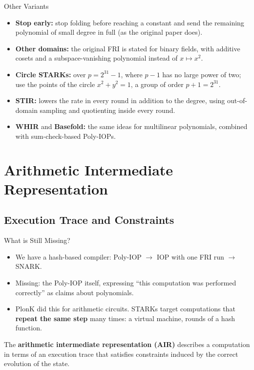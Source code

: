 \documentclass{zkdl-presentation-template}
\begin{document}
    \begin{frame}{Other Variants}
        \begin{itemize}
            \item \textbf{Stop early:} stop folding before reaching a constant and send the remaining polynomial of small degree in full (as the original paper does).\pause
            \item \textbf{Other domains:} the original FRI is stated for binary fields, with additive cosets and a subspace-vanishing polynomial instead of $x \mapsto x^2$.\pause
            \item \textbf{Circle STARKs:} over $p = 2^{31} - 1$, where $p - 1$ has no large power of two; use the points of the circle $x^2 + y^2 = 1$, a group of order $p + 1 = 2^{31}$.\pause
            \item \textbf{STIR:} lowers the rate in every round in addition to the degree, using out-of-domain sampling and quotienting inside every round.\pause
            \item \textbf{WHIR} and \textbf{Basefold:} the same ideas for multilinear polynomials, combined with sum-check-based Poly-IOPs.
        \end{itemize}
    \end{frame}

    \section{Arithmetic Intermediate Representation}

    \subsection{Execution Trace and Constraints}

    \begin{frame}{What is Still Missing?}
        \begin{itemize}
            \item We have a hash-based compiler: Poly-IOP $\to$ IOP with one FRI run $\to$ SNARK.\pause
            \item Missing: the Poly-IOP itself, expressing ``this computation was performed correctly'' as claims about polynomials.\pause
            \item PlonK did this for arithmetic circuits. STARKs target computations that \textbf{repeat the same step} many times: a virtual machine, rounds of a hash function.
        \end{itemize}
        \pause

        \begin{definition}
            The \textbf{arithmetic intermediate representation (AIR)} describes a computation in terms of an execution trace that satisfies constraints induced by the correct evolution of the state.
        \end{definition}
    \end{frame}
\end{document}
